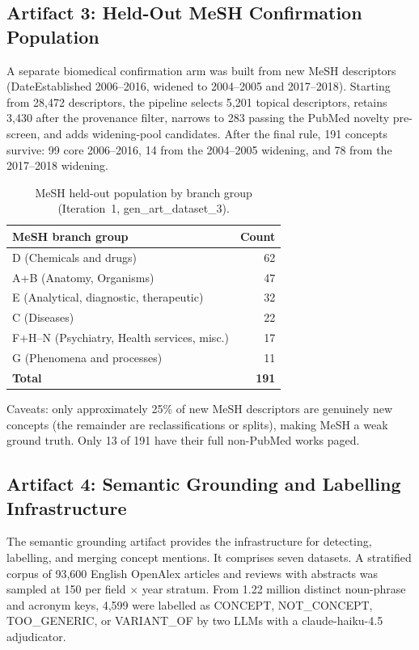 \documentclass[11pt,letterpaper]{article}
\begin{document}
\subsection{Artifact 3: Held-Out MeSH Confirmation Population}

A separate biomedical confirmation arm was built from new MeSH descriptors (DateEstablished 2006--2016, widened to 2004--2005 and 2017--2018).
Starting from 28,472 descriptors, the pipeline selects 5,201 topical descriptors, retains 3,430 after the provenance filter, narrows to 283 passing the PubMed novelty pre-screen, and adds widening-pool candidates.
After the final rule, 191 concepts survive: 99 core 2006--2016, 14 from the 2004--2005 widening, and 78 from the 2017--2018 widening.

\begin{table}[!htbp]
\centering
\caption{MeSH held-out population by branch group (Iteration~1, gen\_art\_dataset\_3).}
\label{tab:mesh_branch}
\begin{tabular}{lr}
\toprule
MeSH branch group & Count \\
\midrule
D (Chemicals and drugs) & 62 \\
A+B (Anatomy, Organisms) & 47 \\
E (Analytical, diagnostic, therapeutic) & 32 \\
C (Diseases) & 22 \\
F+H--N (Psychiatry, Health services, misc.) & 17 \\
G (Phenomena and processes) & 11 \\
\midrule
\textbf{Total} & \textbf{191} \\
\bottomrule
\end{tabular}
\end{table}

Caveats: only approximately 25\% of new MeSH descriptors are genuinely new concepts (the remainder are reclassifications or splits), making MeSH a weak ground truth.
Only 13 of 191 have their full non-PubMed works paged.

\subsection{Artifact 4: Semantic Grounding and Labelling Infrastructure}

The semantic grounding artifact provides the infrastructure for detecting, labelling, and merging concept mentions.
It comprises seven datasets.
A stratified corpus of 93,600 English OpenAlex articles and reviews with abstracts was sampled at 150 per field $\times$ year stratum.
From 1.22 million distinct noun-phrase and acronym keys, 4,599 were labelled as CONCEPT, NOT\_CONCEPT, TOO\_GENERIC, or VARIANT\_OF by two LLMs with a claude-haiku-4.5 adjudicator.
\end{document}
